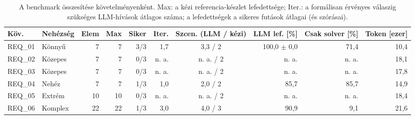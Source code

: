 \begin{table}[htbp]
  \centering
  \small
  \caption{A benchmark összesítése követelményenként. Max: a kézi referencia-készlet lefedettsége; Iter.: a formálisan érvényes válaszig szükséges LLM-hívások átlagos száma; a lefedettségek a sikeres futások átlagai (és szórásai).}
  \label{tab:benchmark-summary}
  \begin{tabular}{llrrrrcrrr}
    \toprule
    Köv. & Nehézség & Elem & Max & Siker & Iter. & Szcen. (LLM / kézi) & LLM lef. [\%] & Csak solver [\%] & Token [ezer] \\
    \midrule
    REQ\_01 & Könnyű & 7 & 7 & 3/3 & 1,7 & 3,3 / 2 & 100,0 $\pm$ 0,0 & 71,4 & 10,4 \\
    REQ\_02 & Közepes & 7 & 7 & 0/3 & n. a. & n. a. / 2 & n. a. & n. a. & 18,1 \\
    REQ\_03 & Közepes & 7 & 7 & 0/3 & n. a. & n. a. / 2 & n. a. & n. a. & 17,8 \\
    REQ\_04 & Nehéz & 7 & 7 & 1/3 & 1,0 & 2,0 / 2 & 85,7 & 85,7 & 14,9 \\
    REQ\_05 & Extrém & 10 & 10 & 0/3 & n. a. & n. a. / 2 & n. a. & n. a. & 18,4 \\
    REQ\_06 & Komplex & 22 & 22 & 1/3 & 3,0 & 4,0 / 3 & 90,9 & 9,1 & 21,6 \\
    \bottomrule
  \end{tabular}
\end{table}
